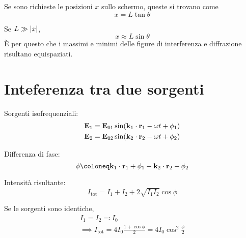 

Se sono richieste le posizioni $x$ sullo schermo, queste si trovano come
\begin{equation}
    x = L \tan \theta
\end{equation}

Se $L \gg \left\lvert x \right\rvert$,
\begin{equation}
    x \approx L \sin\theta
\end{equation}
È per questo che i massimi e minimi delle figure di interferenza e diffrazione risultano equispaziati.

\section{Inteferenza tra due sorgenti}

Sorgenti isofrequenziali:
\begin{subequations}
\begin{gather}
    \mathbf{E}_1 = \mathbf{E}_{01} \sin(\mathbf{k}_1 \cdot \mathbf{r}_1 - \omega t + \phi_1) \\
    \mathbf{E}_2 = \mathbf{E}_{02} \sin(\mathbf{k}_2 \cdot \mathbf{r}_2 - \omega t + \phi_2)
\end{gather}
\end{subequations}

Differenza di fase:
\begin{equation}
    \phi \coloneq \vt{k}_1 \cdot \p_1 + \phi_1 - \vt{k}_2 \cdot \p_2 - \phi_2
\end{equation}

Intensità risultante:
\begin{equation}
    I_\text{tot} = I_1 + I_2 + 2 \sqrt{I_1 I_2} \cos \phi
\end{equation}

Se le sorgenti sono identiche,
\begin{gather}
    I_1 = I_2 \eqcolon I_0 \\
    \implies I_\text{tot} = 4 I_0 \frac{1 + \cos \phi}{2}
    = 4 I_0 \cos^2 \frac{\phi}{2}
\end{gather}

